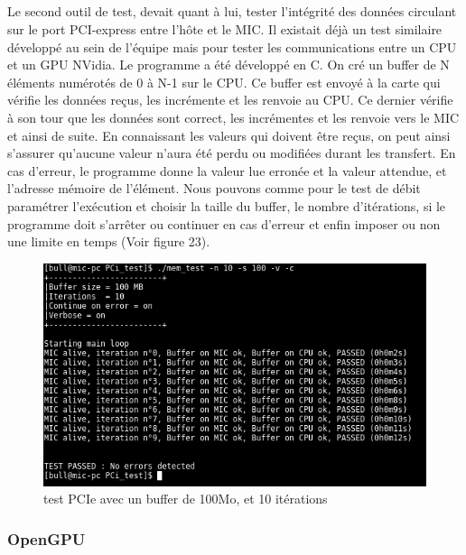 \documentclass[11pt]{article}
\begin{document}
					\subparagraph{}
					Le second outil de test, devait quant à lui, tester l'intégrité des données circulant sur le port PCI-express 
					entre l'hôte et le MIC. Il existait déjà un test similaire développé au sein de l'équipe mais pour tester 
					les communications entre un CPU et un GPU NVidia. \newline
					Le programme a été développé en C. On cré un buffer de N éléments numérotés de 0 à N-1 sur le CPU. Ce buffer 
					est envoyé à la carte qui vérifie les données reçus, les incrémente et les renvoie au CPU. Ce dernier vérifie 
					à son tour que les données sont correct, les incrémentes et les renvoie vers le MIC et ainsi de suite. En 
					connaissant les valeurs qui doivent être reçus, on peut ainsi s'assurer qu'aucune valeur n'aura été perdu ou 
					modifiées durant les transfert. En cas d'erreur, le programme donne la valeur lue erronée et la valeur attendue,
					et l'adresse mémoire de l'élément. Nous pouvons comme pour le test de débit paramétrer l'exécution et choisir 
					la taille du buffer, le nombre d'itérations, si le programme doit s'arrêter ou continuer en cas d'erreur et 
					enfin imposer ou non une limite en temps (Voir figure 23).
					\begin{figure}
					\begin{center}
					\includegraphics[scale=0.4]{memtest.png}
					\caption{test PCIe avec un buffer de 100Mo, et 10 itérations}
					\end{center}
					\end{figure}
			\subsubsection{OpenGPU}
\end{document}
